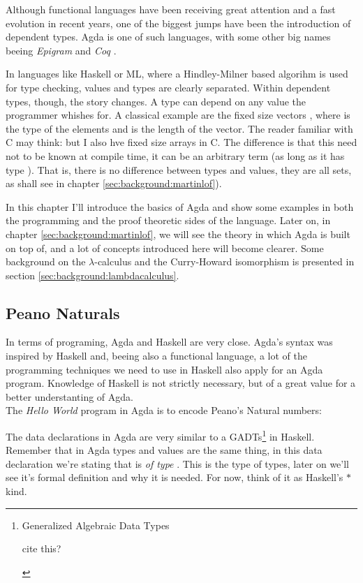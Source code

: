 Although functional languages have been receiving great attention
and a fast evolution in recent years, one of the biggest jumps
have been the introduction of dependent types. Agda\cite{norell07} is one of such languages, with some other 
big names beeing \emph{Epigram} \cite{mcbride05} and \emph{Coq} \cite{bertot06}. 

In languages like Haskell or ML, where a Hindley-Milner based algorihm is used
for type checking, values and types are clearly separated. Within dependent
types, though, the story changes. A type can depend on any value the programmer
whishes for. A classical example are the fixed size vectors , where 
is the type of the elements and  is the length of the vector. The reader familiar
with C may think: but I also hve fixed size arrays in C. The difference is that
this  need not to be known at compile time, it can be an arbitrary term (as long
as it has type ). That is, there is no difference between types and values,
they are all sets, as shall see in chapter \ref{sec:background:martinlof}).

In this chapter I'll introduce the basics of Agda and show some examples in both
the programming and the proof theoretic sides of the language. Later on, in 
chapter \ref{sec:background:martinlof}, we will see the theory in which Agda is built 
on top of, and a lot of concepts introduced here will become clearer. 
Some background on the $\lambda$-calculus and the Curry-Howard isomorphism is
presented in section \ref{sec:background:lambdacalculus}.

\subsection{Peano Naturals}

In terms of programing, Agda and Haskell are very close. Agda's syntax was
inspired by Haskell and, beeing also a functional language, a lot of
the programming techniques we need to use in Haskell also apply for an Agda program.
Knowledge of Haskell is not strictly necessary, but of a great value for a better
understanting of Agda.\\

The \emph{Hello World} program in Agda is to encode Peano's Natural numbers:


The data declarations in Agda are very similar to a GADTs\footnote{
Generalized Algebraic Data Types
\begin{TODO}
  \item cite this?
\end{TODO}
} in Haskell. Remember that in Agda types and values are the same thing, 
in this data declaration we're stating that  is \emph{of type} 
. This  is the type of types, later on we'll
see it's formal definition and why it is needed. For now, think of it
as Haskell's $*$ kind.


